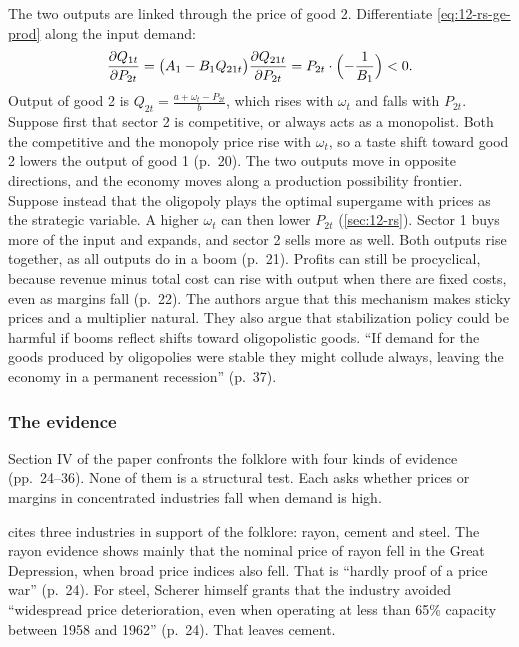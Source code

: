 The two outputs are linked through the price of good 2. Differentiate \eqref{eq:12-rs-ge-prod} along the input demand:
\begin{equation*}
\frac{\partial Q_{1t}}{\partial P_{2t}}
= \bigl(A_1 - B_1Q_{21t}\bigr)\frac{\partial Q_{21t}}{\partial P_{2t}}
= P_{2t}\cdot\Bigl(-\frac{1}{B_1}\Bigr) < 0 .
\end{equation*}
Output of good 2 is $Q_{2t} = \frac{a + \omega_t - P_{2t}}{b}$, which rises with $\omega_t$ and falls with $P_{2t}$.
Suppose first that sector 2 is competitive, or always acts as a monopolist. Both the competitive and the monopoly
price rise with $\omega_t$, so a taste shift toward good 2 lowers the output of good 1 (p.~20). The two outputs move
in opposite directions, and the economy moves along a production possibility frontier. Suppose instead that the
oligopoly plays the optimal supergame with prices as the strategic variable. A higher $\omega_t$ can then lower
$P_{2t}$ (\cref{sec:12-rs}). Sector 1 buys more of the input and expands, and sector 2 sells more as well. Both
outputs rise together, as all outputs do in a boom (p.~21). Profits can still be procyclical, because revenue minus
total cost can rise with output when there are fixed costs, even as margins fall (p.~22). The authors argue that
this mechanism makes sticky prices and a multiplier natural. They also argue that stabilization
policy could be harmful if booms reflect shifts toward oligopolistic goods. ``If demand for the goods produced by
oligopolies were stable they might collude always, leaving the economy in a permanent recession'' (p.~37).

\subsubsection{The evidence}

Section IV of the paper confronts the folklore with four kinds of evidence (pp.~24--36). None of them is a structural
test. Each asks whether prices or margins in concentrated industries fall when demand is high.

\citet{Scherer1980} cites three industries in support of the folklore: rayon, cement and steel. The rayon evidence
shows mainly that the nominal price of rayon fell in the Great Depression, when broad price indices also fell. That
is ``hardly proof of a price war'' (p.~24). For steel, Scherer himself grants that the industry avoided ``widespread
price deterioration, even when operating at less than 65\% capacity between 1958 and 1962'' (p.~24). That leaves
cement.

